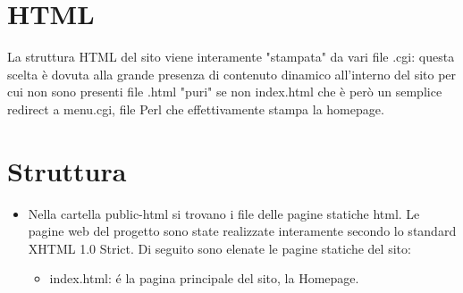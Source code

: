 \documentclass[12pt]{article}
\begin{document}
			\section{HTML}
			La struttura HTML del sito viene interamente "stampata" da vari file .cgi: questa scelta è dovuta alla grande presenza di contenuto dinamico all'interno del sito per cui non sono presenti file .html "puri" se non index.html che è però un semplice redirect a menu.cgi, file Perl che effettivamente stampa la homepage.

			\section{Struttura}
			\begin{itemize}
				\item Nella cartella public-html si trovano i file delle pagine statiche html.
				Le pagine web del progetto sono state realizzate interamente secondo lo standard XHTML 1.0 Strict. Di seguito sono elenate le pagine statiche del sito:
				\begin{itemize} \item index.html: \'e la pagina principale del sito, la Homepage.
					\end{itemize}
				

\end{itemize}
\end{document}
